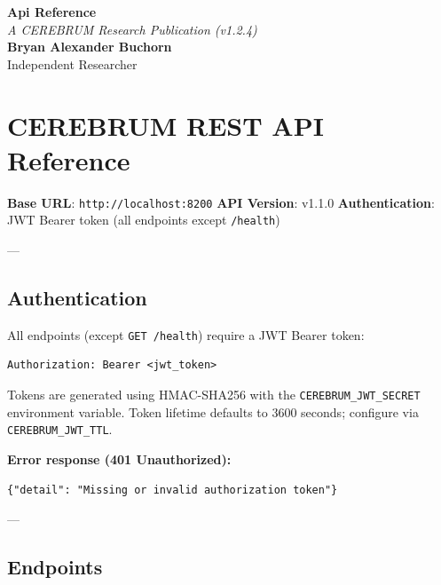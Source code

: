\documentclass[11pt,article,oneside]{memoir}
\begin{document}
\begin{center}
    \Huge \textbf{Api Reference} \\
    \vspace{0.5em}
    \large \textit{A CEREBRUM Research Publication (v1.2.4)} \\
    \vspace{1em}
    \large \textbf{Bryan Alexander Buchorn} \\
    Independent Researcher \\
    \vspace{2em}
\end{center}

\begin{abstract}
\textbf{Overview:} This guide provides a conceptual entry point into the CEREBRUM framework. It is designed for practitioners and researchers seeking to understand the core reasoning signals of Framework Implementation Guide.
\end{abstract}

\section{CEREBRUM REST API Reference}

\textbf{Base URL}: \texttt{http://localhost:8200}
\textbf{API Version}: v1.1.0
\textbf{Authen\-tication}: JWT Bearer token (all endpoints except \texttt{/health})

---

\subsection{Authen\-tication}

All endpoints (except \texttt{GET /health}) require a JWT Bearer token:

\begin{lstlisting}
Authorization: Bearer <jwt_token>
\end{lstlisting}

Tokens are generated using HMAC-SHA256 with the \texttt{CEREBRUM\_JWT\_SECRET} environment variable. Token lifetime defaults to 3600 seconds; configure via \texttt{CEREBRUM\_JWT\_TTL}.

\textbf{Error response (401 Unauth\-orized):}
\begin{lstlisting}
{"detail": "Missing or invalid authorization token"}
\end{lstlisting}

---

\subsection{Endpoints}
\end{document}
